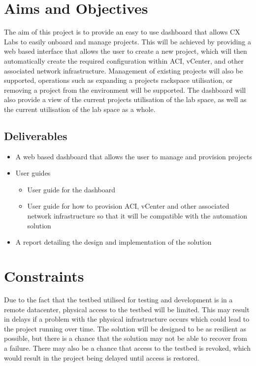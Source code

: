 \section{Aims and Objectives}
\label{intro:aims}

The aim of this project is to provide an easy to use dashboard that allows
CX Labs to easily onboard and manage projects. This
will be achieved by providing a web based interface that allows the user to
create a new project, which will then automatically create the required
configuration within ACI, vCenter, and other associated network infrastructure.
Management of existing projects will also be supported, operations such as
expanding a projects rackspace utilisation, or removing a project from the
environment will be supported. The dashboard will also provide a view of the current projects
utilisation of the lab space, as well as the current utilisation of the lab space as a
whole. 

\subsection{Deliverables}
\label{intro:aims:deliverables}

\begin{itemize}
    \item A web based dashboard that allows the user to manage and provision projects
    \item User guides
          \begin{itemize}
              \item User guide for the dashboard
              \item User guide for how to provision ACI, vCenter and other associated network infrastructure so that it will be compatible with the automation solution
          \end{itemize}
    \item A report detailing the design and implementation of the solution
\end{itemize}

\section{Constraints}
\label{intro:constraints}

Due to the fact that the testbed utilised for testing and development is in a remote datacenter, physical access to the testbed will be limited.
This may result in delays if a problem with the physical infrastructure occurs which could lead to the project running over time.
The solution will be designed to be as resilient as possible, but there is a chance that the solution may not be able to recover from a failure.
There may also be a chance that access to the testbed is revoked, which would result in the project being delayed until access is restored.

